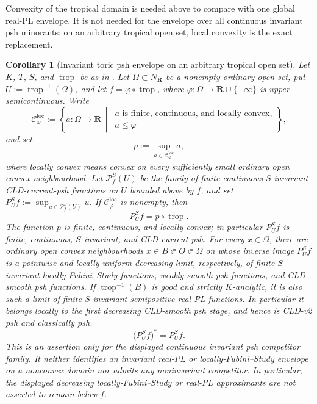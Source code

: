 \documentclass[11pt,a4paper]{article}
\newtheorem{corollary}[corollary]{Corollary}
\theoremstyle{definition}
\theoremstyle{remark}
\begin{document}
Convexity of the tropical domain is needed above to compare with one global
real-PL envelope.  It is not needed for the envelope over all continuous
invariant psh minorants: on an arbitrary tropical open set, local convexity
is the exact replacement.
\begin{corollary}[Invariant toric psh envelope on an arbitrary tropical open set]
\label{cor:p033-invariant-toric-locally-convex-envelope}
Let \(K\), \(T\), \(S\), and \(\operatorname{trop}\) be as in
.  Let
\(\Omega\subset N_{\mathbf R}\) be a nonempty ordinary open set, put
\(U:=\operatorname{trop}^{-1}(\Omega)\), and let
\(f=\varphi\circ\operatorname{trop}\), where
\(\varphi:\Omega\to\mathbf R\cup\{-\infty\}\) is upper semicontinuous.
Write
\[
 \mathcal C^{\mathrm{loc}}_\varphi
 :=\left\{a:\Omega\to\mathbf R\,\middle|\,
     \substack{a\text{ is finite, continuous, and locally convex,}\\
               a\leq\varphi}\right\},
\]
and set
\[
                         p:=\sup_{a\in\mathcal C^{\mathrm{loc}}_\varphi}a,
\]
where locally convex means convex on every sufficiently small ordinary open
convex neighbourhood.  Let \(\mathcal P^S_f(U)\) be the family of finite
continuous \(S\)-invariant CLD-current-psh functions on \(U\) bounded above
by \(f\), and set \(P^S_Uf:=\sup_{u\in\mathcal P^S_f(U)}u\).  If
\(\mathcal C^{\mathrm{loc}}_\varphi\) is nonempty, then
\[
                       P^S_Uf=p\circ\operatorname{trop}.
\]
The function \(p\) is finite, continuous, and locally convex; in particular
\(P^S_Uf\) is finite, continuous, \(S\)-invariant, and CLD-current-psh.
For every \(x\in\Omega\), there are ordinary open convex neighbourhoods
\(x\in B\Subset O\Subset\Omega\) on whose inverse image \(P^S_Uf\) is a
pointwise and locally uniform decreasing limit, respectively, of finite
\(S\)-invariant locally Fubini--Study functions, weakly smooth psh functions,
and CLD-smooth psh functions.  If \(\operatorname{trop}^{-1}(B)\) is good
and strictly \(K\)-analytic, it is also such a limit of finite
\(S\)-invariant semipositive real-PL functions.  In particular it belongs
locally to the first decreasing CLD-smooth psh stage, and hence is CLD-v2 psh
and classically psh.
\[
                         \bigl(P^S_Uf\bigr)^*=P^S_Uf.
\]
This is an assertion only for the displayed continuous invariant psh
competitor family.  It neither identifies an invariant real-PL or
locally-Fubini--Study envelope on a nonconvex domain nor admits any
noninvariant competitor.  In particular, the displayed decreasing
locally-Fubini--Study or real-PL approximants are not asserted to remain
below \(f\).
\end{corollary}
\end{document}
